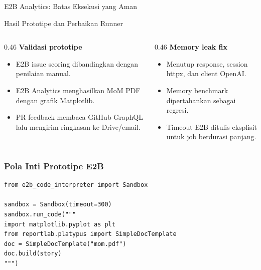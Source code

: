 \begin{contentframe}{E2B Analytics: Batas Eksekusi yang Aman}
\end{contentframe}

\begin{comparisonframe}{Hasil Prototipe dan Perbaikan Runner}
    \begin{columns}[T,onlytextwidth]
        \begin{column}{0.46\textwidth}
            \textbf{Validasi prototipe}\par
            \begin{itemize}\setlength{\itemsep}{3pt}
                \item E2B issue scoring dibandingkan dengan penilaian manual.
                \item E2B Analytics menghasilkan MoM PDF dengan grafik Matplotlib.
                \item PR feedback membaca GitHub GraphQL lalu mengirim ringkasan ke Drive/email.
            \end{itemize}
        \end{column}
        \begin{column}{0.46\textwidth}
            \textbf{Memory leak fix}\par
            \begin{itemize}\setlength{\itemsep}{3pt}
                \item Menutup response, session httpx, dan client OpenAI.
                \item Memory benchmark dipertahankan sebagai regresi.
                \item Timeout E2B ditulis eksplisit untuk job berdurasi panjang.
            \end{itemize}
        \end{column}
    \end{columns}
\end{comparisonframe}

{
\usebackgroundtemplate{\backgroundcontent}
\begin{frame}[fragile]
    \frametitle{Pola Inti Prototipe E2B}
    \begin{lstlisting}
from e2b_code_interpreter import Sandbox

sandbox = Sandbox(timeout=300)
sandbox.run_code("""
import matplotlib.pyplot as plt
from reportlab.platypus import SimpleDocTemplate
doc = SimpleDocTemplate("mom.pdf")
doc.build(story)
""")
    \end{lstlisting}
    \vspace{0.08cm}
\end{frame}
}

